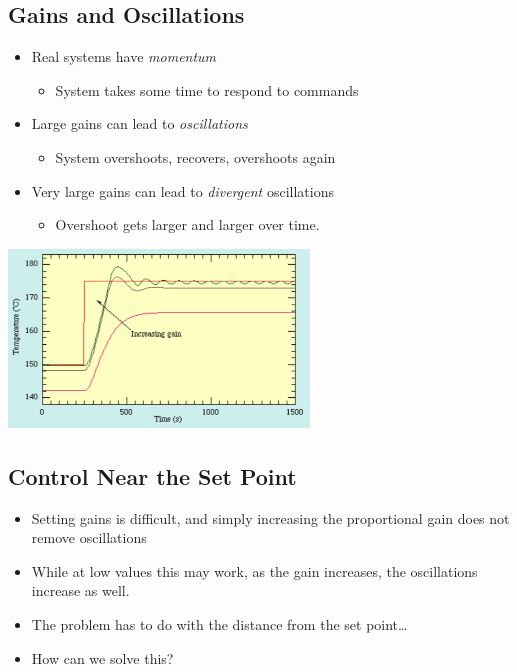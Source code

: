 \documentclass[10pt]{article}
\begin{document}
\subsection*{Gains and Oscillations}
\begin{itemize}
	\item Real systems have \textit{momentum}
	\begin{itemize}
        \item System takes some time to respond to commands
    \end{itemize}
    \item Large gains can lead to \textit{oscillations}
    \begin{itemize}
        \item System overshoots, recovers, overshoots again
    \end{itemize}
    \item Very large gains can lead to \textit{divergent} oscillations
    \begin{itemize}
        \item Overshoot gets larger and larger over time.
    \end{itemize}
\end{itemize}
\begin{center} 
	\includegraphics*[width=0.6\textwidth]{L2_11.png} 
\end{center}

\subsection*{Control Near the Set Point}
\begin{itemize}
	\item Setting gains is difficult, and simply increasing the proportional gain does not remove oscillations
	\item While at low values this may work, as the gain increases, the oscillations increase as well.
	\item The problem has to do with the distance from the set point\dots
	\item How can we solve this?
\end{itemize}
\end{document}
